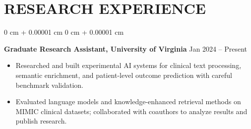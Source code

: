 \documentclass[10pt, letterpaper]{article}
\newenvironment{highlights}{
    \begin{itemize}[
        topsep=0.10 cm,
        parsep=0.10 cm,
        partopsep=0pt,
        itemsep=0pt,
        leftmargin=0 cm + 10pt
    ]
}{
    \end{itemize}
} %
\newenvironment{onecolentry}{
    \begin{adjustwidth}{
        0 cm + 0.00001 cm
    }{
        0 cm + 0.00001 cm
    }
}{
    \end{adjustwidth}
} %
\begin{document}
\section{RESEARCH EXPERIENCE}
\begin{onecolentry}
\textbf{Graduate Research Assistant, University of Virginia} \hfill Jan 2024 -- Present
\begin{highlights}
\item Researched and built experimental AI systems for clinical text processing, semantic enrichment, and patient-level outcome prediction with careful benchmark validation.
\item Evaluated language models and knowledge-enhanced retrieval methods on MIMIC clinical datasets; collaborated with coauthors to analyze results and publish research.
\end{highlights}
\end{onecolentry}
\end{document}
